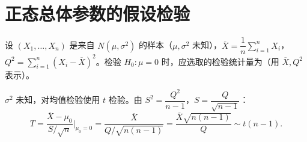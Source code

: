 \documentclass[lang=cn,11pt]{elegantbook}
\begin{document}
\section{正态总体参数的假设检验} \label{sec:ht-normal}

\begin{exercise}[检验统计量的表达式] \label{ex:ht_stat}
设 \((X_1,\dots,X_n)\) 是来自 \(N(\mu,\sigma^2)\) 的样本（\(\mu,\sigma^2\) 未知），\(\overline{X}=\dfrac{1}{n}\displaystyle\sum_{i=1}^{n}X_i\)，\(Q^2=\displaystyle\sum_{i=1}^{n}(X_i-\overline{X})^2\)。检验 \(H_0\colon\mu=0\) 时，应选取的检验统计量为\underline{\qquad}（用 \(\overline{X},Q^2\) 表示）。
\end{exercise}
\begin{solution}
\(\sigma^2\) 未知，对均值检验使用 \(t\) 检验。由 \(S^2=\dfrac{Q^2}{n-1}\)，\(S=\dfrac{Q}{\sqrt{n-1}}\)：
\[
T=\frac{\overline{X}-\mu_0}{S/\sqrt{n}}\bigg|_{\mu_0=0}
=\frac{\overline{X}}{Q/\sqrt{n(n-1)}}=\frac{\overline{X}\sqrt{n(n-1)}}{Q}\sim t(n-1).
\]
\end{solution}
\end{document}
